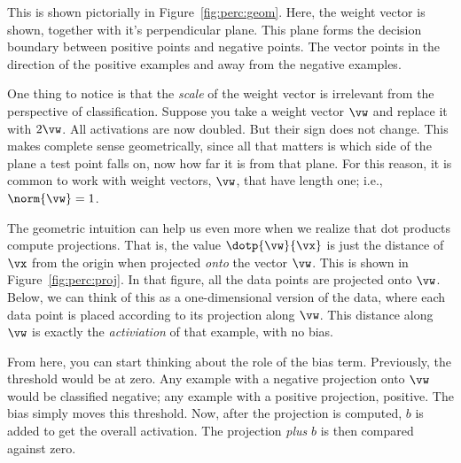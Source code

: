 \MoveNextFigure{-1cm}

This is shown pictorially in Figure~\ref{fig:perc:geom}.  Here, the
weight vector is shown, together with it's perpendicular plane.  This
plane forms the decision boundary between positive points and negative
points.  The vector points in the direction of the positive examples
and away from the negative examples.

One thing to notice is that the \emph{scale} of the weight vector is
irrelevant from the perspective of classification.  Suppose you take a
weight vector $\vw$ and replace it with $2 \vw$.  All activations are
now doubled.  But their sign does not change.  This makes complete
sense geometrically, since all that matters is which side of the plane
a test point falls on, now how far it is from that plane.  For this
reason, it is common to work with 
weight vectors, $\vw$, that have length one; i.e., $\norm{\vw} = 1$.


\MoveNextFigure{-2cm}

The geometric intuition can help us even more when we realize that
dot products compute projections.  That is, the value $\dotp{\vw}{\vx}$
is just the distance of $\vx$ from the origin when projected
\emph{onto} the vector $\vw$.  This is shown in
Figure~\ref{fig:perc:proj}.  In that figure, all the data points are
projected onto $\vw$.  Below, we can think of this as a
one-dimensional version of the data, where each data point is placed
according to its projection along $\vw$.  This distance along $\vw$ is
exactly the \emph{activiation} of that example, with no bias.

From here, you can start thinking about the role of the bias term.
Previously, the threshold would be at zero.  Any example with a
negative projection onto $\vw$ would be classified negative; any
example with a positive projection, positive.  The bias simply moves
this threshold.  Now, after the projection is computed, $b$ is added
to get the overall activation.  The projection \emph{plus} $b$ is then
compared against zero.

